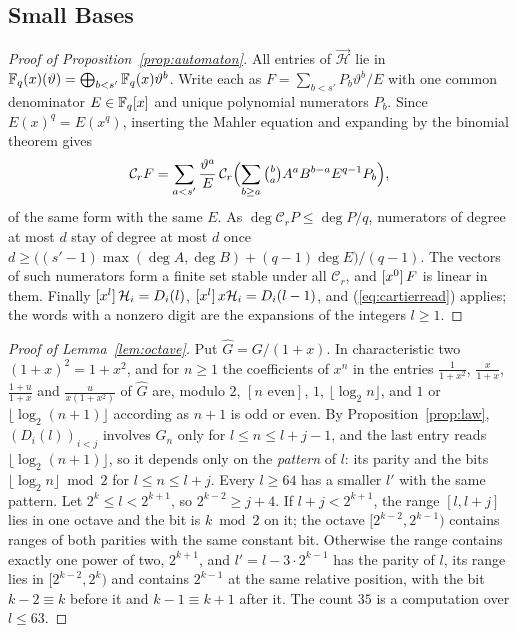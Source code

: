 \subsection{Small Bases}\label{app:smallbases}
\begin{proof}[Proof of Proposition~\ref{prop:automaton}]
All entries of $\vec{\mathcal H}$ lie in $\mathbb{F}_q(x)(\vartheta)=\bigoplus_{b<s'}\mathbb{F}_q(x)\vartheta^b$. Write each as $F=\sum_{b<s'}P_b\vartheta^b/E$ with one common denominator $E\in\mathbb{F}_q[x]$ and unique polynomial numerators $P_b$. Since $E(x)^q=E(x^q)$, inserting the Mahler equation and expanding by the binomial theorem gives
\[
\mathcal C_rF=\sum_{a<s'}\frac{\vartheta^a}{E}\,\mathcal C_r\Bigl(\sum_{b\ge a}\tbinom ba A^aB^{b-a}E^{q-1}P_b\Bigr),
\]
of the same form with the same $E$. As $\deg\mathcal C_rP\le\deg P/q$, numerators of degree at most $d$ stay of degree at most $d$ once $d\ge\bigl((s'-1)\max(\deg A,\deg B)+(q-1)\deg E\bigr)/(q-1)$. The vectors of such numerators form a finite set stable under all $\mathcal C_r$, and $[x^{0}]\,F$ is linear in them. Finally $[x^{l}]\,\mathcal H_i=D_i(l)$, $[x^{l}]\,x\mathcal H_i=D_i(l-1)$, and (\ref{eq:cartierread}) applies; the words with a nonzero digit are the expansions of the integers $l\ge1$.
\end{proof}

\begin{proof}[Proof of Lemma~\ref{lem:octave}]
Put $\hat G=G/(1+x)$. In characteristic two $(1+x)^2=1+x^2$, and for $n\ge1$ the coefficients of $x^n$ in the entries $\frac1{1+x^2}$, $\frac x{1+x}$, $\frac{1+u}{1+x}$ and $\frac u{x(1+x^2)}$ of $\hat G$ are, modulo $2$, $[n\text{ even}]$, $1$, $\lfloor\log_2n\rfloor$, and $1$ or $\lfloor\log_2(n+1)\rfloor$ according as $n+1$ is odd or even. By Proposition~\ref{prop:law}, $(D_i(l))_{i<j}$ involves $\hat G_n$ only for $l\le n\le l+j-1$, and the last entry reads $\lfloor\log_2(n+1)\rfloor$, so it depends only on the \emph{pattern} of $l$: its parity and the bits $\lfloor\log_2n\rfloor\bmod2$ for $l\le n\le l+j$. Every $l\ge64$ has a smaller $l'$ with the same pattern. Let $2^k\le l<2^{k+1}$, so $2^{k-2}\ge j+4$. If $l+j<2^{k+1}$, the range $[l,l+j]$ lies in one octave and the bit is $k\bmod2$ on it; the octave $[2^{k-2},2^{k-1})$ contains ranges of both parities with the same constant bit. Otherwise the range contains exactly one power of two, $2^{k+1}$, and $l'=l-3\cdot2^{k-1}$ has the parity of $l$, its range lies in $[2^{k-2},2^k)$ and contains $2^{k-1}$ at the same relative position, with the bit $k-2\equiv k$ before it and $k-1\equiv k+1$ after it. The count $35$ is a computation over $l\le63$.
\end{proof}
